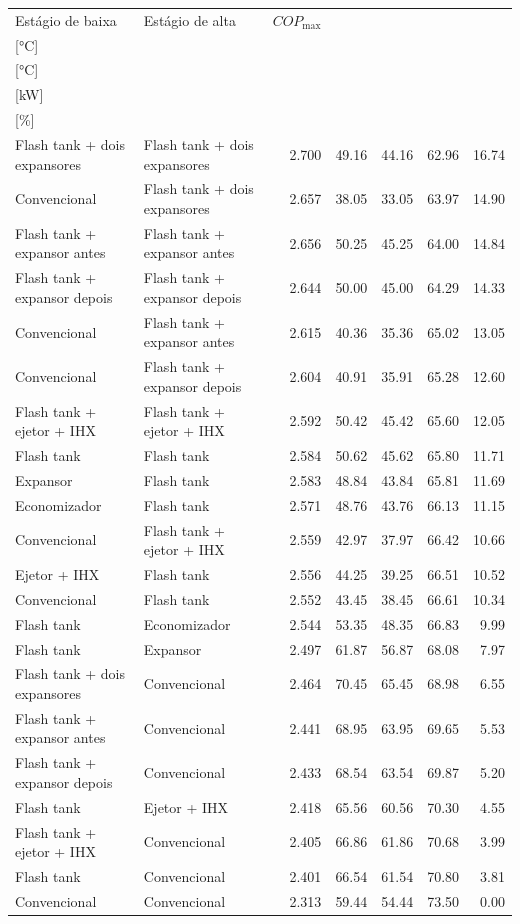 {\small\setlength{\tabcolsep}{4pt}\renewcommand{\arraystretch}{1.12}
\begin{tabular}{llrrrrr}
\toprule
Estágio de baixa & Estágio de alta & $COP_{\max}$ & \shortstack{$T_{\mathrm{cond,l}}^*$\\{[°C]}} & \shortstack{$T_{\mathrm{evap,h}}^*$\\{[°C]}} & \shortstack{$\dot W_{\mathrm{liq}}$\\{[kW]}} & \shortstack{$\Delta COP_{\mathrm{opt}}$\\{[\%]}} \\
\midrule
Flash tank + dois expansores & Flash tank + dois expansores & 2.700 & 49.16 & 44.16 & 62.96 & 16.74 \\
Convencional & Flash tank + dois expansores & 2.657 & 38.05 & 33.05 & 63.97 & 14.90 \\
Flash tank + expansor antes & Flash tank + expansor antes & 2.656 & 50.25 & 45.25 & 64.00 & 14.84 \\
Flash tank + expansor depois & Flash tank + expansor depois & 2.644 & 50.00 & 45.00 & 64.29 & 14.33 \\
Convencional & Flash tank + expansor antes & 2.615 & 40.36 & 35.36 & 65.02 & 13.05 \\
Convencional & Flash tank + expansor depois & 2.604 & 40.91 & 35.91 & 65.28 & 12.60 \\
Flash tank + ejetor + IHX & Flash tank + ejetor + IHX & 2.592 & 50.42 & 45.42 & 65.60 & 12.05 \\
Flash tank & Flash tank & 2.584 & 50.62 & 45.62 & 65.80 & 11.71 \\
Expansor & Flash tank & 2.583 & 48.84 & 43.84 & 65.81 & 11.69 \\
Economizador & Flash tank & 2.571 & 48.76 & 43.76 & 66.13 & 11.15 \\
Convencional & Flash tank + ejetor + IHX & 2.559 & 42.97 & 37.97 & 66.42 & 10.66 \\
Ejetor + IHX & Flash tank & 2.556 & 44.25 & 39.25 & 66.51 & 10.52 \\
Convencional & Flash tank & 2.552 & 43.45 & 38.45 & 66.61 & 10.34 \\
Flash tank & Economizador & 2.544 & 53.35 & 48.35 & 66.83 & 9.99 \\
Flash tank & Expansor & 2.497 & 61.87 & 56.87 & 68.08 & 7.97 \\
Flash tank + dois expansores & Convencional & 2.464 & 70.45 & 65.45 & 68.98 & 6.55 \\
Flash tank + expansor antes & Convencional & 2.441 & 68.95 & 63.95 & 69.65 & 5.53 \\
Flash tank + expansor depois & Convencional & 2.433 & 68.54 & 63.54 & 69.87 & 5.20 \\
Flash tank & Ejetor + IHX & 2.418 & 65.56 & 60.56 & 70.30 & 4.55 \\
Flash tank + ejetor + IHX & Convencional & 2.405 & 66.86 & 61.86 & 70.68 & 3.99 \\
Flash tank & Convencional & 2.401 & 66.54 & 61.54 & 70.80 & 3.81 \\
Convencional & Convencional & 2.313 & 59.44 & 54.44 & 73.50 & 0.00 \\
\bottomrule
\end{tabular}
}
